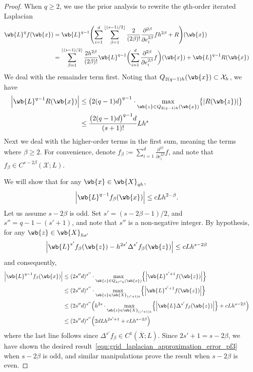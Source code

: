 \documentclass{article}
\newcommand{\abs}[1]{\left \lvert #1 \right \rvert}
\newcommand{\floor}[1]{\left\lfloor #1 \right\rfloor}
\newcommand{\1}{\mathbf{1}}
\newcommand{\Xset}{\mathcal{X}}
\newcommand{\ol}[1]{\overline{#1}}
\theoremstyle{alden}
\theoremstyle{aldenthm}
\theoremstyle{definition}
\theoremstyle{remark}
\begin{document}
\begin{proof}
	When $q \geq 2$, we use the prior analysis to rewrite the $q$th-order iterated Laplacian
	\begin{align}
	\wb{L}^qf(\wb{x}) & = \wb{L}^{q - 1} \Biggl(\sum_{i = 1}^d \sum_{\beta = 1}^{\floor{(s - 1)/2}} \frac{2}{(2\beta)!} \frac{\partial^{2\beta}}{\partial e_i^{2\beta}} f h^{2 \beta} + R\Biggr)(\wb{x}) \nonumber \\
	& = \sum_{\beta = 1}^{\floor{(s - 1)/2}} \frac{2h^{2\beta}}{(2\beta)!} \wb{L}^{q - 1} \biggl(\sum_{i = 1}^d\frac{\partial^{2\beta}}{\partial e_i^{2\beta}} f \biggr)(\wb{x}) + \wb{L}^{q - 1}R(\wb{x}) \label{eqn:grid_laplacian_approximation_error_pf5}
	\end{align}
	We deal with the remainder term first. Noting that $Q_{2(q - 1)h}(\wb{x}) \subset \Xset_{h}$, we have
	\begin{align}
	\abs{\wb{L}^{q - 1}R(\wb{x})} & \leq \bigl(2(q - 1)d\bigr)^{q - 1} \cdot \max_{\wb{z} \in Q_{2(q - 1)h}(\wb{x})} \bigl\{\abs{R(\wb{z})}\bigr\} \nonumber \\
	& \leq \frac{\bigl(2(q - 1)d\bigr)^{q - 1}d}{(s + 1)!} L h^s \label{eqn:grid_laplacian_approximation_error_pf2}
	\end{align}
	Next we deal with the higher-order terms in the first sum, meaning the terms where $\beta \geq 2$. For convenience, denote $f_\beta := \sum_{i = 1}^d\frac{\partial^{2\beta}}{\partial e_i^{2\beta}} f$, and note that $f_{\beta} \in C^{s - 2\beta}(\Xset;L)$. 
	
	We will show that for any $\wb{x} \in \wb{X}_{qh}$,
	\begin{equation}
	\label{eqn:grid_laplacian_approximation_error_pf3}
	\abs{\wb{L}^{q - 1}f_{\beta}(\wb{x})} \leq c L h^{2 - \beta}.
	\end{equation}
	Let us assume $s - 2\beta$ is odd. Set $s' = (s - 2\beta - 1)/2$, and $s'' = q - 1 - (s' + 1)$, and note that $s''$ is a non-negative integer. By hypothesis, for any $\wb{z} \in \wb{X}_{hs'}$
	\begin{equation*}
	\abs{\wb{L}^{s'}f_{\beta}(\wb{z}) - h^{2s'}\Delta^{s'}f_{\beta}(\wb{z})} \leq cLh^{s - 2\beta}
	\end{equation*}
	and consequently,
	\begin{align*}
	\abs{\wb{L}^{q - 1}f_{\beta}(\wb{x})} & \leq (2s''d)^{s''} \cdot \max_{\wb{z} \in Q_{2s''h}(\wb{x})} \Bigl\{\abs{\wb{L}^{s' + 1}f(\wb{z})}\Bigr\} \\
	& \leq (2s''d)^{s''} \cdot \max_{\wb{z} \in \wb{X}_{(s' + 1)h}} \Bigl\{\abs{\wb{L}^{s' + 1}f(\wb{z})}\Bigr\}  \\
	& \leq (2s''d)^{s''} \Bigl( h^{2s} \cdot \max_{\wb{z} \in \wb{X}_{(s' + 1)h}} \Bigl\{ \abs{\wb{L} \Delta^{s'} f_{\beta}(\wb{z})} \Bigr\} + cLh^{s - 2\beta}\Bigr) \\
	& \leq (2s''d)^{s''} \Bigl( 2dL h^{2s' + 1}  + cLh^{s - 2\beta}\Bigr)
	\end{align*}
	where the last line follows since $\Delta^{s'}{f_{\beta}} \in C^1(\ol{X};L)$. Since $2s' + 1 = s - 2\beta$, we have shown the desired result~\eqref{eqn:grid_laplacian_approximation_error_pf3} when $s - 2\beta$ is odd, and similar manipulations prove the result when $s - 2\beta$ is even. 
	

\end{proof}
\end{document}
